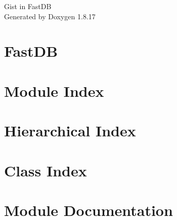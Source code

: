 \let\mypdfximage\pdfximage\def\pdfximage{\immediate\mypdfximage}\documentclass[twoside]{book}
\newcommand{\+}{\discretionary{\mbox{\scriptsize$\hookleftarrow$}}{}{}}
\newcommand{\clearemptydoublepage}{%
  \newpage{\pagestyle{empty}\cleardoublepage}%
}
\begin{document}
\hypersetup{pageanchor=false,
             bookmarksnumbered=true,
             pdfencoding=unicode
            }
\begin{titlepage}
\vspace*{7cm}
\begin{center}%
{\Large Gist in Fast\+DB }\\
\vspace*{1cm}
{\large Generated by Doxygen 1.8.17}\\
\end{center}
\end{titlepage}
\clearemptydoublepage
{}
\tableofcontents
\clearemptydoublepage
{}
\hypersetup{pageanchor=true}

\chapter{Fast\+DB}
\label{md_README}

\chapter{Module Index}

\chapter{Hierarchical Index}

\chapter{Class Index}

\chapter{Module Documentation}

\end{document}
